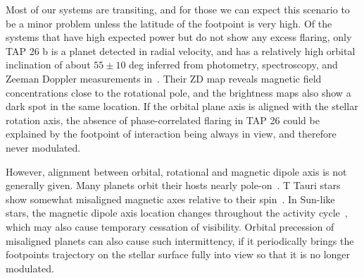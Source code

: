 \documentclass[twocolumn]{aastex631}
\begin{document}
Most of our systems are transiting, and for those we can expect this scenario to be a minor problem unless the latitude of the footpoint is very high. Of the systems that have high expected power but do not show any excess flaring, only TAP 26 b is a planet detected in radial velocity, and has a relatively high orbital inclination of about $55\pm10$ deg inferred from photometry, spectroscopy, and Zeeman Doppler measurements in~\citet{yu2017hot}. Their ZD map reveals magnetic field concentrations close to the rotational pole, and the brightness maps also show a dark spot in the same location. If the orbital plane axis is aligned with the stellar rotation axis, the absence of phase-correlated flaring in TAP 26 could be explained by the footpoint of interaction being always in view, and therefore never modulated. 

However, alignment between orbital, rotational and magnetic dipole axis is not generally given. Many planets orbit their hosts nearly pole-on~\citep{albrecht2012obliquities, albrecht2022stellar, bourrier2023dream}. T Tauri stars show somewhat misaligned magnetic axes relative to their spin~\citep{mcginnis2020magnetic}. In Sun-like stars, the magnetic dipole axis location changes throughout the activity cycle~\citep{petit2009polarity,borosaikia2018direct}, which may also cause temporary cessation of visibility. Orbital precession of misaligned planets can also cause such intermittency, if it periodically brings the footpoints trajectory on the stellar surface fully into view so that it is no longer modulated. 




\end{document}
